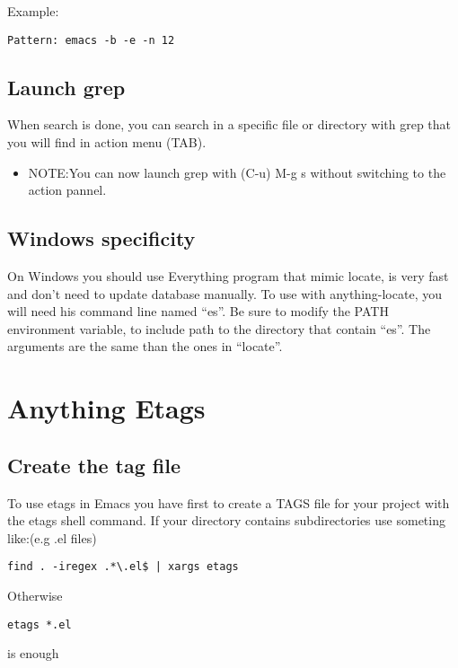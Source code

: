 \documentclass[a4paper,11pt]{article}
\begin{document}
Example:
\begin{verbatim}
Pattern: emacs -b -e -n 12
\end{verbatim}

\subsection{Launch grep}
\label{sec:launch-grep}

When search is done, you can search in a specific file or directory with grep that you will find in action menu (TAB).\\

\begin{itemize}
\item NOTE:You can now launch grep with (C-u) M-g s without switching to the action pannel.
\end{itemize}

\subsection{Windows specificity}
\label{sec:windows-specificity}

On Windows you should use Everything program that mimic locate, is very fast and don't need to
update database manually.
To use with anything-locate, you will need his command line named ``es''.
Be sure to modify the PATH environment variable, to include path to the directory that contain ``es''.
The arguments are the same than the ones in ``locate''.

\section{Anything Etags}
\label{sec:anything-etags}

\subsection{Create the tag file}
\label{sec:create-tag-file}


To use etags in Emacs you have first to create a TAGS file for your project with the etags shell command.
If your directory contains subdirectories use someting like:(e.g .el files)
\begin{verbatim}
find . -iregex .*\.el$ | xargs etags
\end{verbatim}
Otherwise
\begin{verbatim}
etags *.el
\end{verbatim}
is enough
\end{document}
